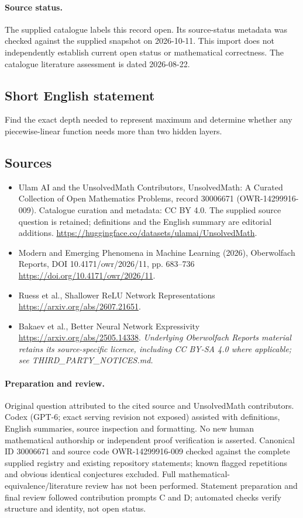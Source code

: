 \documentclass[11pt]{article}
\begin{document}
\paragraph{Source status.}
The supplied catalogue labels this record open. Its source-status metadata was checked against the supplied snapshot on 2026-10-11. This import does not independently establish current open status or mathematical correctness. The catalogue literature assessment is dated 2026-08-22.
\subsection{Short English statement}
Find the exact depth needed to represent maximum and determine whether any piecewise-linear function needs more than two hidden layers.
\subsection{Sources}
\begin{itemize}
\item[\hypertarget{source:30006671:1}{S1}] Ulam AI and the UnsolvedMath Contributors, UnsolvedMath: A Curated Collection of Open Mathematics Problems, record 30006671 (OWR-14299916-009). Catalogue curation and metadata: CC BY 4.0. The supplied source question is retained; definitions and the English summary are editorial additions.
\url{https://huggingface.co/datasets/ulamai/UnsolvedMath}.
\item[\hypertarget{source:30006671:2}{S2}] Modern and Emerging Phenomena in Machine Learning (2026), Oberwolfach Reports, DOI 10.4171/owr/2026/11, pp. 683--736
\url{https://doi.org/10.4171/owr/2026/11}.
\item[\hypertarget{source:30006671:3}{S3}] Ruess et al., Shallower ReLU Network Representations
\url{https://arxiv.org/abs/2607.21651}.
\item[\hypertarget{source:30006671:4}{S4}] Bakaev et al., Better Neural Network Expressivity
\url{https://arxiv.org/abs/2505.14338}.
\textit{Underlying Oberwolfach Reports material retains its source-specific licence, including CC BY-SA 4.0 where applicable; see THIRD\_PARTY\_NOTICES.md.}
\end{itemize}
\paragraph{Preparation and review.}
Original question attributed to the cited source and UnsolvedMath contributors. Codex (GPT-6; exact serving revision not exposed) assisted with definitions, English summaries, source inspection and formatting. No new human mathematical authorship or independent proof verification is asserted. Canonical ID 30006671 and source code OWR-14299916-009 checked against the complete supplied registry and existing repository statements; known flagged repetitions and obvious identical conjectures excluded. Full mathematical-equivalence/literature review has not been performed. Statement preparation and final review followed contribution prompts C and D; automated checks verify structure and identity, not open status.
\label{end:30006671}
\end{document}
